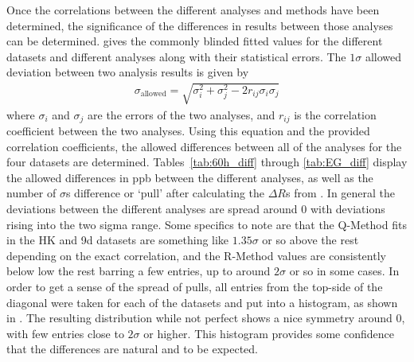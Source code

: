 Once the correlations between the different analyses and methods have been determined, the significance of the differences in results between those analyses can be determined.  gives the commonly blinded fitted \R values for the different datasets and different analyses along with their statistical errors. The $1\sigma$ allowed deviation between two analysis results is given by
\begin{align}
	\sigma_{\text{allowed}} = \sqrt{\sigma^{2}_{i} + \sigma^{2}_{j} - 2r_{ij}\sigma_{i}\sigma_{j}}
\end{align}
where $\sigma_{i}$ and $\sigma_{j}$ are the errors of the two analyses, and $r_{ij}$ is the correlation coefficient between the two analyses. Using this equation and the provided correlation coefficients, the allowed differences between all of the analyses for the four datasets are determined. Tables~\ref{tab:60h_diff} through \ref{tab:EG_diff} display the allowed differences in ppb between the different analyses, as well as the number of $\sigma$s difference or `pull' after calculating the $\Delta R$s from .  In general the deviations between the different analyses are spread around 0 with deviations rising into the two sigma range. Some specifics to note are that the Q-Method fits in the HK and 9d datasets are something like $1.35\sigma$ or so above the rest depending on the exact correlation, and the R-Method values are consistently below low the rest barring a few entries, up to around $2\sigma$ or so in some cases. In order to get a sense of the spread of pulls, all entries from the top-side of the diagonal were taken for each of the datasets and put into a histogram, as shown in . The resulting distribution while not perfect shows a nice symmetry around 0, with few entries close to $2\sigma$ or higher. This histogram provides some confidence that the differences are natural and to be expected.









